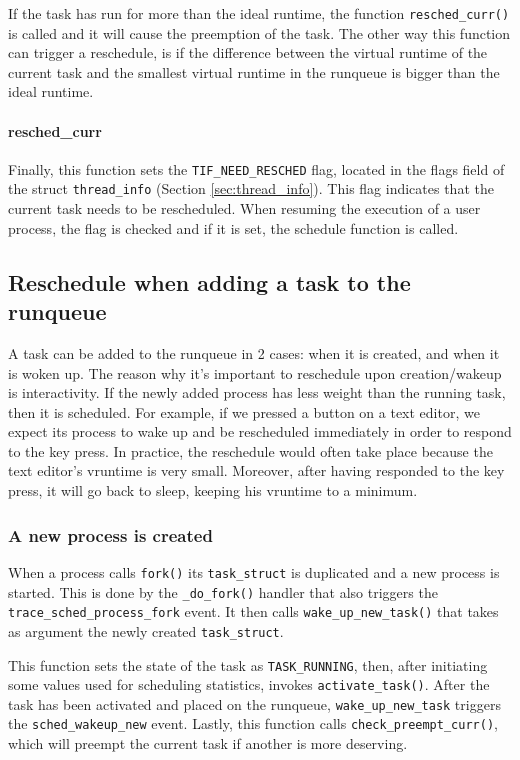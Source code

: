 If the task has run for more than the ideal runtime, the function \verb|resched_curr()| is called and it will cause the preemption of the task. The other way this function can trigger a reschedule, is if the difference between the virtual runtime of the current task and the smallest virtual runtime in the runqueue is bigger than the ideal runtime.

\paragraph{resched\_curr}\label{trace:wake_idle_without_ipi}
Finally, this function sets the \verb|TIF_NEED_RESCHED| flag, located in the flags field of the struct \verb|thread_info| (Section \ref{sec:thread_info}). 
This flag indicates that the current task needs to be rescheduled. When resuming the execution of a user process, the flag is checked and if it is set, the schedule function is called.

\subsection{Reschedule when adding a task to the runqueue}
A task can be added to the runqueue in 2 cases: when it is created, and when it is woken up. The reason why it's important to reschedule upon creation/wakeup is interactivity. If the newly added process has less weight than the running task, then it is scheduled. For example, if we pressed a button on a text editor, we expect its process to wake up and be rescheduled immediately in order to respond to the key press. In practice, the reschedule would often take place because the text editor's vruntime is very small. Moreover, after having responded to the key press, it will go back to sleep, keeping his vruntime to a minimum.

\subsubsection{A new process is created}
When a process calls \verb|fork()| its \verb|task_struct| is duplicated and a new process is started. This is done by the \verb|_do_fork()| handler that also triggers the \verb|trace_sched_process_fork|\label{trace:sched_process_fork} event. It then calls \verb|wake_up_new_task()| that takes as argument the newly created \verb|task_struct|. 

This function sets the state of the task as \verb|TASK_RUNNING|, then, after initiating some values used for scheduling statistics, invokes \verb|activate_task()|. After the task has been activated and placed on the runqueue, \verb|wake_up_new_task| triggers the \verb|sched_wakeup_new| \label{trace:sched_wakeup_new} event. Lastly, this function calls \verb|check_preempt_curr()|, which will preempt the current task if another is more deserving. 


